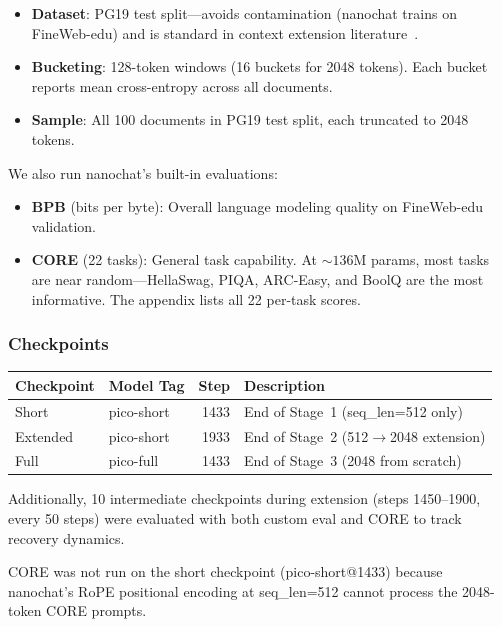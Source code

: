\begin{itemize}
  \item \textbf{Dataset}: PG19 test split---avoids contamination (nanochat trains on FineWeb-edu) and is standard in context extension literature~\cite{pi,yarn,longrope}.
  \item \textbf{Bucketing}: 128-token windows (16 buckets for 2048 tokens). Each bucket reports mean cross-entropy across all documents.
  \item \textbf{Sample}: All 100 documents in PG19 test split, each truncated to 2048 tokens.
\end{itemize}

We also run nanochat's built-in evaluations:
\begin{itemize}
  \item \textbf{BPB} (bits per byte): Overall language modeling quality on FineWeb-edu validation.
  \item \textbf{CORE} (22 tasks): General task capability. At ${\sim}136$M params, most tasks are near random---HellaSwag, PIQA, ARC-Easy, and BoolQ are the most informative. The appendix lists all 22 per-task scores.
\end{itemize}

\subsubsection{Checkpoints}

\begin{table}[H]
\centering\small
\begin{tabular}{@{}llrl@{}}
\toprule
Checkpoint & Model Tag & Step & Description \\
\midrule
Short & pico-short & 1433 & End of Stage~1 (seq\_len=512 only) \\
Extended & pico-short & 1933 & End of Stage~2 (512$\to$2048 extension) \\
Full & pico-full & 1433 & End of Stage~3 (2048 from scratch) \\
\bottomrule
\end{tabular}
\end{table}

Additionally, 10 intermediate checkpoints during extension (steps 1450--1900, every 50 steps) were evaluated with both custom eval and CORE to track recovery dynamics.

CORE was not run on the short checkpoint (pico-short@1433) because nanochat's RoPE positional encoding at seq\_len=512 cannot process the 2048-token CORE prompts.

